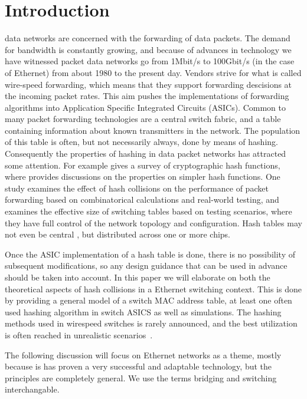\section{Introduction}
 data networks are concerned with the forwarding of data packets.
The demand for bandwidth is constantly growing,  and because of advances in technology
we have witnessed packet data networks go from 1Mbit/s to 100Gbit/s (in the 
case of Ethernet) from about 1980 to the present day.
Vendors strive for what is called wire-speed forwarding, which means that they support
forwarding descisions at the incoming packet rates. This aim pushes the implementations of forwarding 
algorithms into Application Specific Integrated Circuits (ASICs).
Common to many packet forwarding technologies are a central switch fabric, and 
a table containing information about known transmitters in the network.
The population of this table is often, but not necessarily always, done by means of hashing. Consequently
the properties of hashing in data packet networks has attracted some attention. For example
\cite{Tiwari2010} gives a survey of cryptographic hash functions, where \cite{Sedgewick2011}  provides 
discussions on the properties on simpler hash functions. One study \cite{Huntley2006} examines the effect of hash collisions 
on the performance of packet forwarding based on  combinatorical calculations and real-world testing, and
\cite{Stancu2003} examines the effective size of switching tables based on testing scenarios, where 
they have full control of the network topology and configuration. Hash tables may not 
even be central \cite{Ray2007}, but distributed across one or more chips.

Once  the ASIC implementation of a hash table is done, there is no possibility of subsequent 
modifications, so any design guidance that can be used in advance should be taken into
account. 
In this paper we will elaborate on both the theoretical aspects of hash collisions in a Ethernet switching 
context. 
This is done by providing a general model of a switch MAC address table, at least one often used 
hashing algorithm in switch ASICS as well as simulations. The hashing methods used in 
wirespeed switches is rarely announced, and the best utilization is often reached in 
unrealistic scenarios~\cite{Huntley2006}\cite{Stancu2003}.

The following discussion will focus on Ethernet networks as a theme, 
mostly because is has proven a very successful and adaptable technology\cite{Song2002},
but the principles are completely general. 
We use the terms bridging and switching interchangable.


